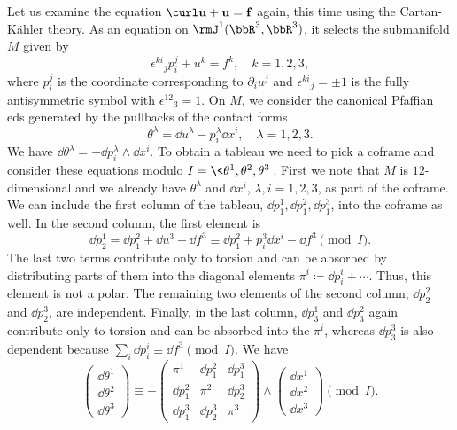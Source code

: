 \begin{example}\label{example curl pde 2}
    Let us examine the equation $\curl \bf{u}+\bf{u}=\bf{f}$ again, this time using the Cartan-K\"ahler theory. As an equation on $\rmJ^1(\bbR^3,\bbR^3)$, it selects the submanifold $M$ given by 
    \[\epsilon^{ki}{}_j p^j_i+u^k=f^k,\quad k=1,2,3,\]
    where $p^j_i$ is the coordinate corresponding to $\partial_i u^j$ and $\epsilon^{ki}{}_j=\pm 1$ is the fully antisymmetric symbol with $\epsilon^{12}{}_3=1$. On $M$, we consider the canonical Pfaffian \gls{eds} generated by the pullbacks of the contact forms 
    \[\theta^\lambda=\dd u^\lambda-p^\lambda_i \dd x^i,\quad \lambda=1,2,3.\]
    We have $\dd\theta^\lambda=-\dd p^\lambda_i\wedge\dd x^i$. To obtain a tableau we need to pick a coframe and consider these equations modulo $I=\<\theta^1,\theta^2,\theta^3\>$. First we note that $M$ is $12$-dimensional and we already have $\theta^\lambda$ and $\dd x^i$, $\lambda,i=1,2,3$, as part of the coframe. We can include the first column of the tableau, $\dd p^1_1,\dd p^2_1,\dd p^3_1$, into the coframe as well. In the second column, the first element is 
    \[\dd p^1_2=\dd p^2_1+\dd u^3-\dd f^3\equiv \dd p^2_1+p^3_i\dd x^i-\dd f^3\pmod{I}.\]
    The last two terms contribute only to torsion and can be absorbed by distributing parts of them into the diagonal elements $\pi^i\coloneqq \dd p^i_i+\cdots$. Thus, this element is not a polar. The remaining two elements of the second column, $\dd p^2_2$ and $\dd p^3_2$, are independent. Finally, in the last column, $\dd p^1_3$ and $\dd p^2_3$ again contribute only to torsion and can be absorbed into the $\pi^i$, whereas $\dd p^3_3$ is also dependent because $\sum_i \dd p^i_i\equiv \dd f^3\pmod{I}$. We have 
    \[
    \begin{pmatrix}
        \dd\theta^1\\\dd\theta^2\\\dd \theta^3
    \end{pmatrix}\equiv -
    \begin{pmatrix}
        \boxed{\pi^1} & \dd p^2_1 & \dd p^3_1\\
        \boxed{\dd p^2_1} & \boxed{\pi^2} & \dd p^3_2\\
        \boxed{\dd p^3_1} & \boxed{\dd p^3_2} & \pi^3
    \end{pmatrix}\wedge\begin{pmatrix}
    \dd x^1\\\dd x^2\\ \dd x^3
    \end{pmatrix}\pmod{I}.
\]
\end{example}

